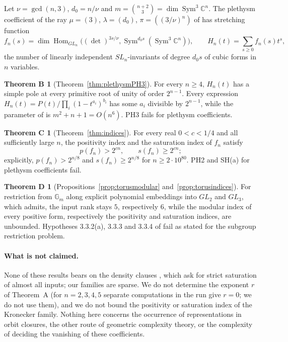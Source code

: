 \documentclass[11pt,a4paper]{article}
\theoremstyle{definition}
\newtheorem*{thmB}{Theorem B}
\newtheorem*{thmC}{Theorem C}
\newtheorem*{thmD}{Theorem D}
\newcommand{\C}{\mathbb{C}}
\newcommand{\Gm}{\mathbb{G}_m}
\newcommand{\Sym}{\operatorname{Sym}}
\newcommand{\Hom}{\operatorname{Hom}}
\begin{document}
Let $\nu=\gcd(n,3)$, $d_0=n/\nu$ and $m=\binom{n+2}3=\dim\Sym^3\C^n$. The
plethysm coefficient of the ray $\mu=(3)$, $\lambda=(d_0)$, $\pi=((3/\nu)^n)$
of \cite[Section 1.6]{GCT6} has stretching function
\[
 f_n(s)=\dim\Hom_{GL_n}\bigl((\det)^{3s/\nu},\Sym^{d_0s}(\Sym^3\C^n)\bigr),
 \qquad H_n(t)=\sum_{s\ge0}f_n(s)t^s ,
\]
the number of linearly independent $SL_n$-invariants of degree $d_0s$ of
cubic forms in $n$ variables.

\begin{thmB}[Theorem~\ref{thm:plethysmPH3}]
For every $n\ge4$, $H_n(t)$ has a simple pole at every primitive root of unity
of order $2^{n-1}$. Every expression $H_n(t)=P(t)/\prod_i(1-t^{a_i})^{b_i}$ has
some $a_i$ divisible by $2^{n-1}$, while the parameter of
\cite[Hypothesis 1.6.7]{GCT6} is $m^2+n+1=O(n^6)$. PH3 fails for plethysm
coefficients.
\end{thmB}

\begin{thmC}[Theorem~\ref{thm:indices}]
For every real $0<c<1/4$ and all sufficiently large $n$, the positivity index
and the saturation index of $f_n$ satisfy
\[
 p(f_n)>2^{cn},\qquad s(f_n)\ge2^{cn};
\]
explicitly, $p(f_n)>2^{n/8}$ and $s(f_n)\ge2^{n/8}$ for $n\ge2\cdot10^{80}$.
PH2 and SH(a) for plethysm coefficients \cite[Hypotheses 1.6.5(a),
1.6.6]{GCT6} fail.
\end{thmC}

\begin{thmD}[Propositions~\ref{prop:torusmodular} and~\ref{prop:torusindices}]
For restriction from $\Gm$ along explicit polynomial embeddings into $GL_2$
and $GL_3$, which \cite[Section 3.4]{GCT6} admits, the input rank stays $5$,
respectively $6$, while the modular index of every positive form, respectively
the positivity and saturation indices, are unbounded. Hypotheses 3.3.2(a),
3.3.3 and 3.3.4 of \cite{GCT6} fail as stated for the subgroup restriction
problem.
\end{thmD}

\paragraph{What is not claimed.}
None of these results bears on the density clauses \cite[Hypotheses
1.6.5(b), 3.3.2(b)]{GCT6}, which ask for strict saturation of almost all
inputs; our families are sparse. We do not determine the exponent $r$ of
Theorem~A (for $n=2,3,4,5$ separate computations in the run give $r=0$; we do
not use them), and we do not bound the positivity or saturation index of the
Kronecker family. Nothing here concerns the occurrence of representations in
orbit closures, the other route of geometric complexity theory, or the
complexity of deciding the vanishing of these coefficients.
\end{document}
